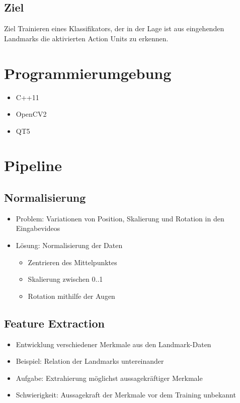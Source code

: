 \documentclass{beamer}
\begin{document}
\subsection{Ziel}
\begin{frame}
  \begin{block}{Ziel}
    Trainieren eines Klassifikators, der in der Lage ist aus eingehenden Landmarks die aktivierten Action Units zu erkennen.
  \end{block}
\end{frame}

\section{Programmierumgebung}
\begin{frame}
  \begin{itemize}
    \item C++11
    \item OpenCV2
    \item QT5
  \end{itemize}
\end{frame}

\section{Pipeline}
\subsection{Normalisierung}
\begin{frame}
  \begin{itemize}
    \item Problem: Variationen von Position, Skalierung und
      Rotation in den Eingabevideos
    \item Lösung: Normalisierung der Daten
    \begin{itemize}
      \item Zentrieren des Mittelpunktes
      \item Skalierung zwischen 0..1
      \item Rotation mithilfe der Augen
    \end{itemize}
  \end{itemize}
\end{frame}

\subsection{Feature Extraction}
\begin{frame}
  \begin{itemize}
    \item Entwicklung verschiedener Merkmale aus den Landmark-Daten
    \item Beispiel: Relation der Landmarks untereinander
    \item Aufgabe: Extrahierung möglichst aussagekräftiger Merkmale
    \item Schwierigkeit: Aussagekraft der Merkmale vor dem Training unbekannt
  \end{itemize}
\end{frame}
\end{document}
